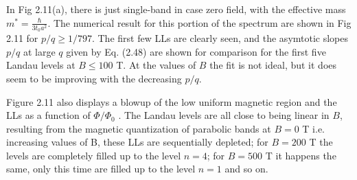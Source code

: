 \documentclass{report}
\begin{document}
In Fig 2.11(a), there is just single-band in case zero field, with the effective mass $m^{*} = \frac{\hbar}{3 t_{0} a^{2}}$. The numerical result for this portion of the spectrum are shown in Fig 2.11 for $p/q \geq 1/797$. The first few LLs are clearly seen, and the asymtotic slopes $p/q$ at large $q$ given by Eq. (2.48) are shown for comparison for the first five Landau levels at $B \leq 100$ T. At the values of $B$ the fit is not ideal, but it does seem to be improving with the decreasing $p/q$.

Figure 2.11 also displays a blowup of the low uniform magnetic region and the \ac{LLs} as a function of $\Phi / \Phi_{0}$ \cite{Li_2011}. The Landau levels are all close to being linear in $B$, resulting from the magnetic quantization of parabolic bands at $B = 0$ T i.e. increasing values of B, these \ac{LLs} are sequentially depleted; for $B=200$ T the levels are completely filled up to the level $n=4$; for $B = 500$ T it happens the same, only this time are filled up to the level $n=1$ and so on.

%
%
\end{document}
